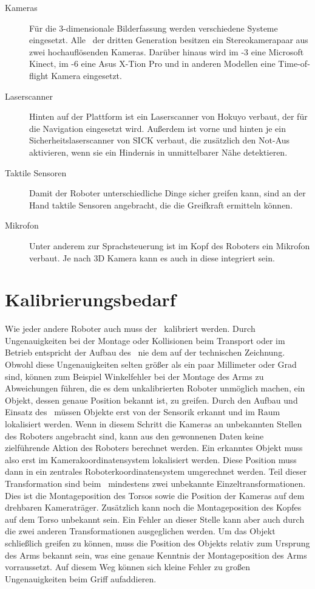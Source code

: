 \begin{description}
  \item[Kameras] Für die 3-dimensionale Bilderfassung werden
    verschiedene Systeme eingesetzt. Alle \cob\ der dritten Generation
    besitzen ein Stereokamerapaar aus zwei hochauflösenden Kameras.
    Darüber hinaus wird im -3 eine Microsoft Kinect, im -6 eine
    Asus X-Tion Pro und in anderen Modellen eine Time-of-flight Kamera
    eingesetzt. 
  \item[Laserscanner] Hinten auf der Plattform ist ein
    Laserscanner von Hokuyo verbaut, der für die Navigation eingesetzt wird.
    Außerdem ist vorne und hinten je ein Sicherheitslaserscanner von SICK
    verbaut, die zusätzlich den Not-Aus aktivieren, wenn sie ein Hindernis in
    unmittelbarer Nähe detektieren. 
  \item[Taktile Sensoren]
    Damit der Roboter unterschiedliche Dinge sicher greifen kann, sind an der
    Hand taktile Sensoren angebracht, die die Greifkraft ermitteln können.
  \item[Mikrofon] Unter anderem zur Sprachsteuerung ist im Kopf des Roboters ein
    Mikrofon verbaut. Je nach 3D Kamera kann es auch in diese integriert sein.
\end{description}


%
%

\section{Kalibrierungsbedarf} %
\label{sec:Kalibrierungsbedarf}
Wie jeder andere Roboter auch muss der \cob\ kalibriert werden. Durch Ungenauigkeiten bei 
der Montage oder Kollisionen beim Transport oder im Betrieb entspricht der Aufbau des \cob\
nie dem auf der technischen Zeichnung. Obwohl diese Ungenauigkeiten selten größer als ein 
paar Millimeter oder Grad sind, können zum Beispiel Winkelfehler bei der Montage des Arms 
zu Abweichungen führen, die es dem unkalibrierten Roboter unmöglich machen, ein Objekt, dessen
genaue Position bekannt ist, zu greifen. Durch den Aufbau und Einsatz des \cob\ müssen 
Objekte erst von der Sensorik erkannt und im Raum lokalisiert werden. Wenn in diesem Schritt 
die Kameras an unbekannten Stellen des Roboters angebracht sind, kann aus den gewonnenen
Daten keine zielführende Aktion des Roboters berechnet werden. Ein erkanntes Objekt muss also 
erst im Kamerakoordinatensystem lokalisiert werden. Diese Position muss dann in ein zentrales 
Roboterkoordinatensystem umgerechnet werden. Teil dieser Transformation sind beim \cob\ mindestens
zwei unbekannte Einzeltransformationen. Dies ist die Montageposition des Torsos sowie die 
Position der Kameras auf dem drehbaren Kameraträger. Zusätzlich kann noch die Montageposition
des Kopfes auf dem Torso unbekannt sein. Ein Fehler an dieser Stelle kann aber auch durch die
zwei anderen Transformationen ausgeglichen werden. Um das Objekt schließlich greifen zu können,
muss die Position des Objekts relativ zum Ursprung des Arms bekannt sein, was eine genaue
Kenntnis der Montageposition des Arms vorraussetzt. Auf diesem Weg können sich kleine Fehler
zu großen Ungenauigkeiten beim Griff aufaddieren.

